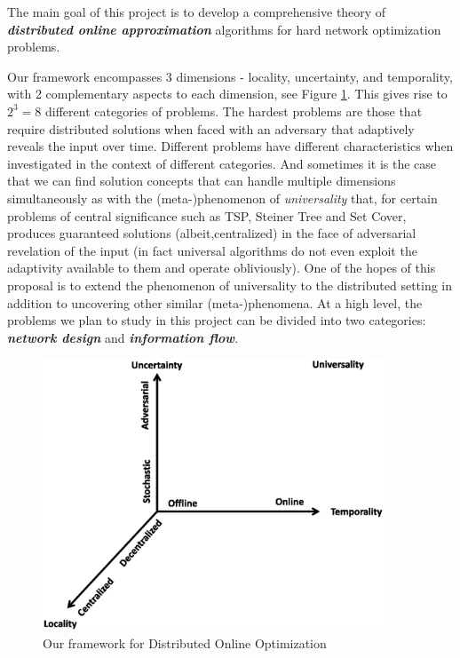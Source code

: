 The main goal of this project is to develop a comprehensive theory of
{\bf \em distributed online approximation}\/ algorithms for hard network
optimization problems.

Our framework encompasses 3 dimensions - locality, uncertainty, and temporality, 
with 2 complementary aspects to each dimension, see Figure \ref{fig:dimensions}. 
This gives rise to $2^3 = 8$ different categories of problems. 
The hardest problems are those that require distributed solutions when 
faced with an adversary that adaptively reveals the input over time. Different
problems have different characteristics when investigated in the context of
different categories. And sometimes it is the case that we can find solution
concepts that can handle multiple dimensions simultaneously as with the
(meta-)phenomenon of {\em universality} \cite{} that, for certain problems of central
significance such as TSP, Steiner Tree and Set Cover, produces guaranteed solutions 
(albeit,centralized)
in the face of adversarial revelation of the input (in fact universal algorithms
do not even exploit the adaptivity available to them and operate obliviously).  
One of the hopes of this proposal is to extend the phenomenon of universality to
the distributed setting in addition to uncovering other similar (meta-)phenomena.
At a high level, the problems we plan to study in this project can be
divided into two categories: {\bf \em network design}\/ and {\bf \em
information flow}.

\begin{figure}
\centering
\includegraphics[width=4in]{dimensions.ps}
\caption{Our framework for Distributed Online Optimization}
\label{fig:dimensions}
\end{figure}


